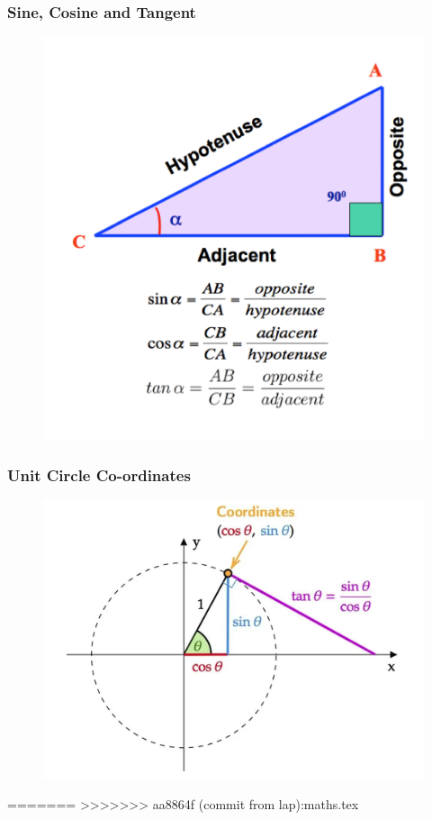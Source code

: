 \documentclass{beamer}
\begin{document}
\begin{frame}
    \frametitle{Sine, Cosine and Tangent}
    \begin{figure}[h]    
        \begin{minipage}[b]{0.8\textwidth}
        \centering
        \includegraphics[scale=0.22]{sine-cosine-tangent.png}
    \end{minipage}
\end{figure}
\end{frame}

\begin{frame}
    \frametitle{Unit Circle Co-ordinates}
    \begin{figure}[h]    
        \begin{minipage}[b]{0.8\textwidth}
        \centering
        \includegraphics[scale=0.22]{8.png}
    \end{minipage}
\end{figure}
\end{frame}
=======
>>>>>>> aa8864f (commit from lap):maths.tex
\end{document}
